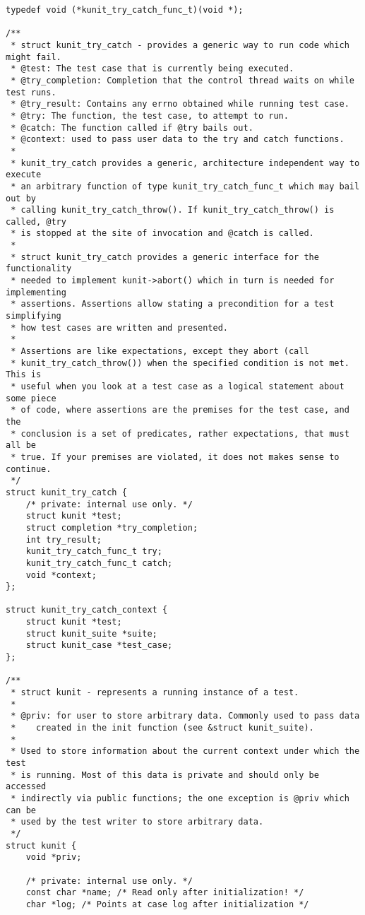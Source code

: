 \documentclass{article}
\begin{document}
\begin{lstlisting}[style=CStyle]
typedef void (*kunit_try_catch_func_t)(void *);

/**
 * struct kunit_try_catch - provides a generic way to run code which might fail.
 * @test: The test case that is currently being executed.
 * @try_completion: Completion that the control thread waits on while test runs.
 * @try_result: Contains any errno obtained while running test case.
 * @try: The function, the test case, to attempt to run.
 * @catch: The function called if @try bails out.
 * @context: used to pass user data to the try and catch functions.
 *
 * kunit_try_catch provides a generic, architecture independent way to execute
 * an arbitrary function of type kunit_try_catch_func_t which may bail out by
 * calling kunit_try_catch_throw(). If kunit_try_catch_throw() is called, @try
 * is stopped at the site of invocation and @catch is called.
 *
 * struct kunit_try_catch provides a generic interface for the functionality
 * needed to implement kunit->abort() which in turn is needed for implementing
 * assertions. Assertions allow stating a precondition for a test simplifying
 * how test cases are written and presented.
 *
 * Assertions are like expectations, except they abort (call
 * kunit_try_catch_throw()) when the specified condition is not met. This is
 * useful when you look at a test case as a logical statement about some piece
 * of code, where assertions are the premises for the test case, and the
 * conclusion is a set of predicates, rather expectations, that must all be
 * true. If your premises are violated, it does not makes sense to continue.
 */
struct kunit_try_catch {
	/* private: internal use only. */
	struct kunit *test;
	struct completion *try_completion;
	int try_result;
	kunit_try_catch_func_t try;
	kunit_try_catch_func_t catch;
	void *context;
};

struct kunit_try_catch_context {
	struct kunit *test;
	struct kunit_suite *suite;
	struct kunit_case *test_case;
};

/**
 * struct kunit - represents a running instance of a test.
 *
 * @priv: for user to store arbitrary data. Commonly used to pass data
 *	  created in the init function (see &struct kunit_suite).
 *
 * Used to store information about the current context under which the test
 * is running. Most of this data is private and should only be accessed
 * indirectly via public functions; the one exception is @priv which can be
 * used by the test writer to store arbitrary data.
 */
struct kunit {
	void *priv;

	/* private: internal use only. */
	const char *name; /* Read only after initialization! */
	char *log; /* Points at case log after initialization */


\end{lstlisting}
\end{document}
